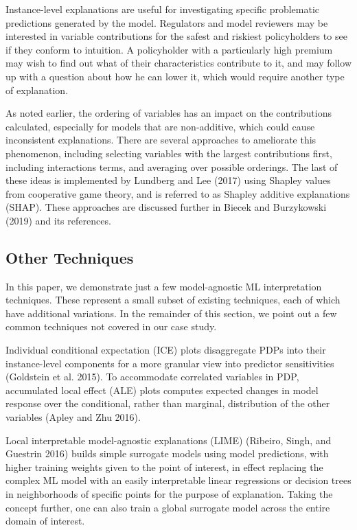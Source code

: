 \documentclass[preprint, 3p, twocolumn, letterpaper, 10pt]{elsarticle} %
\begin{document}
Instance-level explanations are useful for investigating specific problematic
predictions generated by the model. Regulators and model reviewers may be
interested in variable contributions for the safest and riskiest policyholders
to see if they conform to intuition. A policyholder with a particularly high
premium may wish to find out what of their characteristics contribute to it,
and may follow up with a question about how he can lower it, which would
require another type of explanation.

As noted earlier, the ordering of variables has an impact on the contributions
calculated, especially for models that are non-additive, which could cause
inconsistent explanations. There are several approaches to ameliorate this
phenomenon, including selecting variables with the largest contributions first,
including interactions terms, and averaging over possible orderings. The last
of these ideas is implemented by Lundberg and Lee (2017) using Shapley values from
cooperative game theory, and is referred to as Shapley additive explanations
(SHAP). These approaches are discussed further in Biecek and Burzykowski (2019) and its references.

\hypertarget{other-techniques}{%
\subsection{Other Techniques}\label{other-techniques}}

In this paper, we demonstrate just a few model-agnostic ML interpretation
techniques. These represent a small subset of existing techniques, each of
which have additional variations. In the remainder of this section, we point
out a few common techniques not covered in our case study.

Individual conditional expectation (ICE) plots disaggregate PDPs into their
instance-level components for a more granular view into predictor sensitivities
(Goldstein et al. 2015). To accommodate correlated variables in PDP, accumulated
local effect (ALE) plots computes expected changes in model response over the
conditional, rather than marginal, distribution of the other variables
(Apley and Zhu 2016).

Local interpretable model-agnostic explanations (LIME) (Ribeiro, Singh, and Guestrin 2016)
builds simple surrogate models using model predictions, with higher training
weights given to the point of interest, in effect replacing the complex ML model
with an easily interpretable linear regressions or decision trees in
neighborhoods of specific points for the purpose of explanation. Taking the
concept further, one can also train a global surrogate model across the entire
domain of interest.
\end{document}
